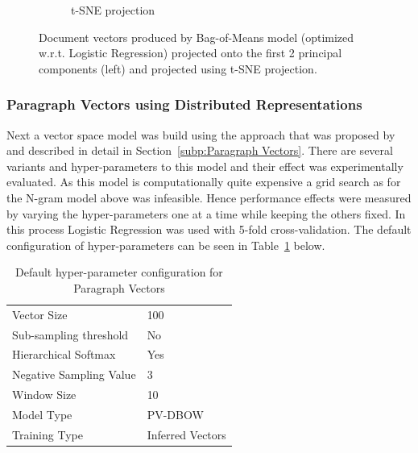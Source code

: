 \begin{figure}[h!]
\begin{subfigure}[b]{0.48\textwidth}
      \caption{t-SNE projection}
\label{fig:bom-tsne}
    \end{subfigure}
    \caption{Document vectors produced by Bag-of-Means model (optimized w.r.t. Logistic Regression) projected onto the first 2 principal components (left) and projected using t-SNE projection. }
\label{fig:bom}
\end{figure}

\subsubsection{Paragraph Vectors using Distributed Representations}
\label{subs:Paragraph Vectors using Distributed Representations}

Next a vector space model was build using the approach that was proposed by \cite{Le:2014aa} and described in detail in Section~\ref{subp:Paragraph Vectors}. There are several variants and hyper-parameters to this model and their effect was experimentally evaluated. As this model is computationally quite expensive a grid search as for the N-gram model above was infeasible. Hence performance effects were measured by varying the hyper-parameters one at a time while keeping the others fixed. In this process Logistic Regression was used with 5-fold cross-validation. The default configuration of hyper-parameters can be seen in Table~\ref{tab:Paragraph Vector Defaults} below.

\begin{table}[h]
  \begin{center}
  \begin{tabular}{ l | l }
    \toprule
    Vector Size & 100 \\
    Sub-sampling threshold & No \\
    Hierarchical Softmax & Yes \\
    Negative Sampling Value & 3 \\
    Window Size & 10 \\
    Model Type & PV-DBOW \\
    Training Type & Inferred Vectors \\
    \bottomrule
  \end{tabular}
  \caption{Default hyper-parameter configuration for Paragraph Vectors}
  \label{tab:Paragraph Vector Defaults}
\end{center}
\end{table}


